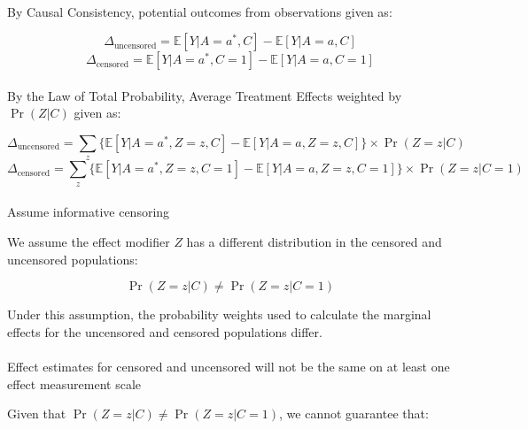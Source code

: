 \documentclass[
  singlecolumn]{article}
\makeatletter
\let\oldparagraph\paragraph
\renewcommand{\paragraph}{
    \@ifstar
      \xxxParagraphStar
      \xxxParagraphNoStar
  }
\newcommand{\xxxParagraphStar}[1]{\oldparagraph*{#1}\mbox{}}
\newcommand{\xxxParagraphNoStar}[1]{\oldparagraph{#1}\mbox{}}
\makeatother
\begin{document}
\paragraph{By Causal Consistency, potential outcomes from observations
given
as:}\label{by-causal-consistency-potential-outcomes-from-observations-given-as}

\[
\Delta_{\text{uncensored}} = \mathbb{E}[Y|A=a^*,C] - \mathbb{E}[Y|A=a,C]
\] \[
\Delta_{\text{censored}} = \mathbb{E}[Y|A=a^*,C=1] - \mathbb{E}[Y|A=a,C=1]
\]

\paragraph{\texorpdfstring{By the Law of Total Probability, Average
Treatment Effects weighted by \(\Pr(Z|C)\) given
as:}{By the Law of Total Probability, Average Treatment Effects weighted by \textbackslash Pr(Z\textbar C) given as:}}\label{by-the-law-of-total-probability-average-treatment-effects-weighted-by-przc-given-as}

\[
\Delta_{\text{uncensored}} = \sum_{z} \bigg\{\mathbb{E}[Y|A=a^*,Z=z,C] - \mathbb{E}[Y|A=a,Z=z,C]\bigg\}\times \Pr(Z=z|C)
\] \[
\Delta_{\text{censored}} = \sum_{z} \bigg\{\mathbb{E}[Y|A=a^*,Z=z,C=1] - \mathbb{E}[Y|A=a,Z=z,C=1]\bigg\} \times \Pr(Z=z|C=1)
\]

\paragraph{Assume informative
censoring}\label{assume-informative-censoring}

We assume the effect modifier \(Z\) has a different distribution in the
censored and uncensored populations:

\[\Pr(Z=z|C) \neq \Pr(Z=z|C=1)\]

Under this assumption, the probability weights used to calculate the
marginal effects for the uncensored and censored populations differ.

\paragraph{Effect estimates for censored and uncensored will not be the
same on at least one effect measurement
scale}\label{effect-estimates-for-censored-and-uncensored-will-not-be-the-same-on-at-least-one-effect-measurement-scale}

Given that \(\Pr(Z=z|C) \neq \Pr(Z=z|C=1)\), we cannot guarantee that:
\end{document}
